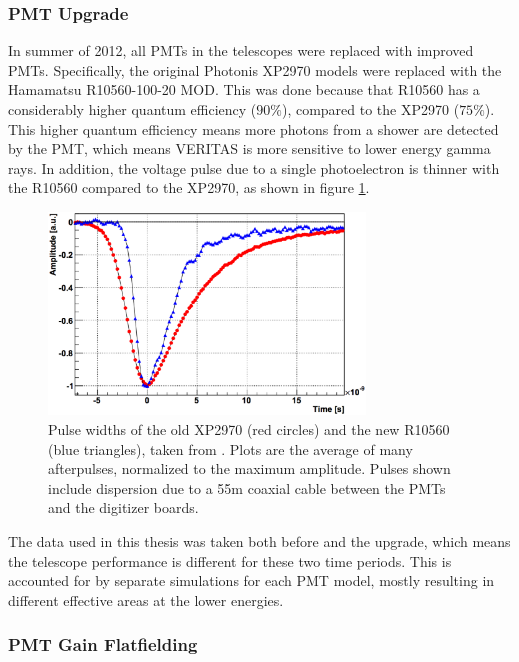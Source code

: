 \subsubsection{PMT Upgrade}
In summer of 2012, all PMTs in the telescopes were replaced with improved PMTs.
Specifically, the original Photonis XP2970 models were replaced with the Hamamatsu R10560-100-20 MOD.
This was done because that R10560 has a considerably higher quantum efficiency (\nicetilde$90\%$), compared to the XP2970 (\nicetilde$75\%$).
This higher quantum efficiency means more photons from a shower are detected by the PMT, which means VERITAS is more sensitive to lower energy gamma rays\cite{pmtmodels}.
In addition, the voltage pulse due to a single photoelectron is thinner with the R10560 compared to the XP2970, as shown in figure \ref{fig:pmt_pulse_widths}.

\begin{figure}[h]
  \begin{center}
    \includegraphics[width=0.75\textwidth]{images/pmt_models_pulsewidths.eps}
    \caption[Pulse Widths]{Pulse widths of the old XP2970 (red circles) and the new R10560 (blue triangles), taken from \cite{pmtmodels}.  Plots are the average of many afterpulses, normalized to the maximum amplitude.  Pulses shown include dispersion due to a \nicetilde55m coaxial cable between the PMTs and the digitizer boards.}\label{fig:pmt_pulse_widths}
  \end{center}
\end{figure}

The data used in this thesis was taken both before and the upgrade, which means the telescope performance is different for these two time periods.
This is accounted for by separate simulations for each PMT model, mostly resulting in different effective areas at the lower energies.


\subsubsection{PMT Gain Flatfielding}

